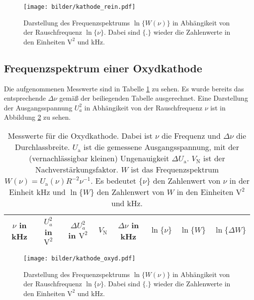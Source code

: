 	\begin{figure}
		\centering
		\texttt{[image: bilder/kathode\_rein.pdf]}
		\caption{Darstellung des Frequenzspektrums $\ln\{W(\nu)\}$ in
		Abhängikeit von der Rauschfrequenz $\ln\{\nu\}$. Dabei sind $\{ . \}$ wieder
		die Zahlenwerte in den Einheiten $\text{V}^2$ und kHz.}
		\label{fig:kathode_rein}
	\end{figure}

\clearpage
\subsection{Frequenzspektrum einer Oxydkathode}

	Die aufgenommenen Messwerte sind in Tabelle
	\ref{tab:kathode_oxyd} zu sehen. Es wurde bereits das
	entsprechende $\Delta \nu$ gemäß der beiliegenden Tabelle
	ausgerechnet. Eine Darstellung der Ausgangsspannung $U_a^2$ in
	Abhängikeit von der Rauschfrequenz $\nu$ ist in Abbildung
	\ref{fig:kathode_oxyd} zu sehen.
	\begin{table}
		\centering
		\begin{tabular}{cccccccc}
		\toprule \midrule
		$\nu$ in kHz	 & $U_a^2$ in $\text{V}^2$	& $\Delta U_a^2$ in $\text{V}^2$ &
		$V_\text{N}$	 & $\Delta \nu$ in kHz 		& $\ln \{\nu\}$				     &
		$\ln \{W\}$	 & $\ln \{\Delta W\} $ \\
		\midrule
		
		\midrule
		\bottomrule
		\end{tabular}
		\caption{Messwerte für
		die Oxydkathode. Dabei ist $\nu$ die Frequenz und $\Delta \nu$ die
		Durchlassbreite. $U_\text{a}$ ist die gemessene Ausgangsspannung, mit der
		(vernachlässigbar kleinen) Ungenauigkeit $\Delta U_\text{a}$. $V_\text{N}$
		ist der Nachverstärkungsfaktor. $W$ ist das Frequenzspektrum
		$W(\nu)=U_\text{a}(\nu) R^{-2} \nu^{-1}$. Es bedeutet $\{\nu \}$ den
		Zahlenwert von $\nu$ in der Einheit kHz und $\ln\{W\}$ den Zahlenwert
		von $W$ in den Einheiten $\text{V}^2$ und kHz.}
		\label{tab:kathode_oxyd}
	\end{table}

	\begin{figure}
		\centering
		\texttt{[image: bilder/kathode\_oxyd.pdf]}
		\caption{Darstellung des Frequenzspektrums $\ln\{W(\nu)\}$ in
		Abhängikeit von der Rauschfrequenz $\ln\{\nu\}$. Dabei sind $\{ . \}$ wieder
		die Zahlenwerte in den Einheiten $\text{V}^2$ und kHz.}
		\label{fig:kathode_oxyd}
	\end{figure}

